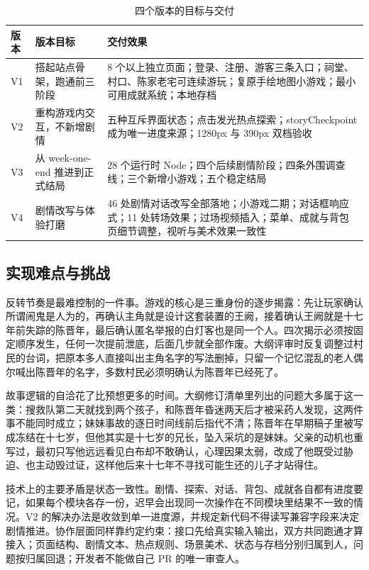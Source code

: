 \begin{table}[htbp]
\centering
\caption{四个版本的目标与交付}
\small
\begin{tabularx}{\linewidth}{@{}l p{4.0cm} X@{}}
\toprule
版本 & 版本目标 & 交付效果 \\
\midrule
V1 & 搭起站点骨架，跑通前三阶段 &
8 个以上独立页面；登录、注册、游客三条入口；祠堂、村口、陈家老宅可连续游玩；复原手绘地图小游戏；最小可用成就系统；本地存档 \\
\addlinespace
V2 & 重构游戏内交互，不新增剧情 &
五种互斥界面状态；点击发光热点探索；storyCheckpoint 成为唯一进度来源；1280px 与 390px 双档验收 \\
\addlinespace
V3 & 从 week-one-end 推进到正式结局 &
28 个运行时 Node；四个后续剧情阶段；四条外围调查线；三个新增小游戏；五个稳定结局 \\
\addlinespace
V4 & 剧情改写与体验打磨 &
46 处剧情对话改写全部落地；小游戏二期；对话框响应式；11 处转场效果；过场视频插入；菜单、成就与背包页细节调整，视听与美术效果一致性 \\
\bottomrule
\end{tabularx}
\end{table}

\subsection{实现难点与挑战}

反转节奏是最难控制的一件事。游戏的核心是三重身份的逐步揭露：先让玩家确认所谓闹鬼是人为的，再确认主角就是设计这套装置的王阙，接着确认王阙就是十七年前失踪的陈晋年，最后确认匿名举报的白灯客也是同一个人。四次揭示必须按固定顺序发生，任何一次提前泄底，后面几步就全部作废。大纲评审时反复调整过村民的台词，把原本多人直接叫出主角名字的写法删掉，只留一个记忆混乱的老人偶尔喊出陈晋年的名字，多数村民必须明确认为陈晋年已经死了。

故事逻辑的自洽花了比预想更多的时间。大纲修订清单里列出的问题大多属于这一类：搜救队第二天就找到两个孩子，和陈晋年昏迷两天后才被采药人发现，这两件事不能同时成立；妹妹事故的逐日时间线前后指代不清；陈晋年在早期稿子里被写成冻结在十七岁，但他其实是十七岁的兄长，坠入采坑的是妹妹。父亲的动机也重写过，最初只写他远远看见白布却不敢确认，心理因果太弱，改成了他既受过胁迫、也主动毁过证，这样他后来十七年不寻找可能生还的儿子才站得住。

技术上的主要矛盾是状态一致性。剧情、探索、对话、背包、成就各自都有进度要记，如果每个模块各存一份，迟早会出现同一次操作在不同模块里结果不一致的情况。V2 的解决办法是收敛到单一进度源，并规定新代码不得读写兼容字段来决定剧情推进。协作层面同样靠约定约束：接口先给真实输入输出，双方共同跑通才算接入；页面结构、剧情文本、热点规则、场景美术、状态与存档分别归属到人，问题按归属回退；开发者不能做自己 PR 的唯一审查人。


